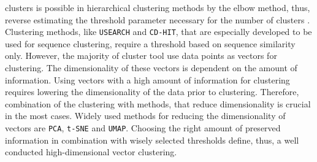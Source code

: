 clusters is possible in hierarchical clustering methods by the elbow method, thus, reverse estimating the threshold parameter necessary for the number of clusters \autocite{madhulatha_overview_2012}. Clustering methods, like \texttt{USEARCH} and \texttt{CD-HIT}, that are especially developed to be used for sequence clustering, require a threshold based on sequence similarity only. However, the majority of cluster tool use data points as vectors for clustering. The dimensionality of these vectors is dependent on the amount of information. Using vectors with a high amount of information for clustering requires lowering the dimensionality of the data prior to clustering. Therefore, combination of the clustering with methods, that reduce dimensionality is crucial in the most cases. Widely used methods for reducing the dimensionality of vectors are \texttt{PCA}, \texttt{t-SNE} and \texttt{UMAP}. Choosing the right amount of preserved information in combination with wisely selected thresholds define, thus, a well conducted high-dimensional vector clustering. 

